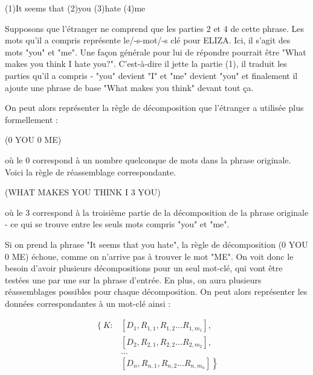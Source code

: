 \documentclass[11pt, a4paper]{report}
\begin{document}
  \begin{center}
    (1)It seems that (2)you (3)hate (4)me
  \end{center} 
  
  Supposons que l'étranger ne comprend que les parties 2 et 4 de cette phrase. Les mots qu'il a compris 
  représente le/-s-mot/-s clé pour ELIZA. Ici, il s'agit des mots "you" et "me". Une façon générale 
  pour lui de répondre pourrait être "What makes you think I hate you?". C'est-à-dire il jette la partie (1), 
  il traduit les parties qu'il a compris - "you" devient "I" et "me" devient "you" et finalement il 
  ajoute une phrase de base "What makes you think" devant tout ça. 

  On peut alors représenter la règle de décomposition que l'étranger a utilisée plus formellement :

  \begin{center}
    (0 YOU 0 ME)
  \end{center} 

  où le 0 correspond à un nombre quelconque de mots dans la phrase originale. 
  Voici la règle de réassemblage correspondante.

  \begin{center}
    (WHAT MAKES YOU THINK I 3 YOU)
  \end{center} 
  
  où le 3 correspond à la troisième partie de la décomposition de la phrase originale 
  - ce qui se trouve entre les seuls mots compris "you" et "me". 
   
  Si on prend la phrase "It seems that you hate", la règle de décomposition 
  (0 YOU 0 ME) échoue, comme on n'arrive pas à trouver le mot "ME". On voit donc le 
  besoin d'avoir plusieurs décompositions pour un seul mot-clé, qui vont être testées 
  une par une sur la phrase d'entrée. En plus, on aura plusieurs réassemblages possibles pour 
  chaque décomposition. On peut alors représenter les données correspondantes à un mot-clé 
  ainsi : 

  \begin{align*}
    \left\{ K: \right. 
    &\left[ D_{1}, R_{1, 1}, R_{1, 2} \ldots R_{1, m_{1}} \right], \\
    &\left[ D_{2}, R_{2, 1}, R_{2, 2} \ldots R_{2, m_{2}} \right], \\
    &\ldots \\
    &\left. \left[ D_{n}, R_{n, 1}, R_{n, 2} \ldots R_{n, m_{n}} \right] \right\}
  \end{align*}
\end{document}
